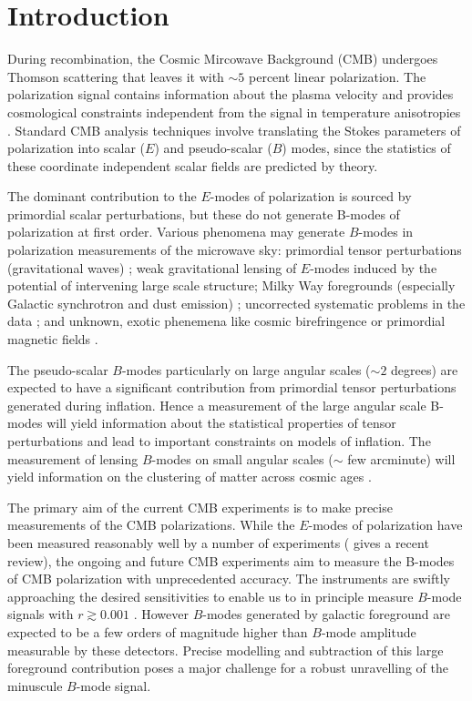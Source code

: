 \section{Introduction}
During recombination, the Cosmic Mircowave Background (CMB) undergoes Thomson scattering that leaves it with $\sim 5$ percent linear polarization.  The polarization signal contains information about the plasma velocity and provides cosmological constraints independent from the signal in temperature anisotropies \citep{1997NewA....2..323H}.  Standard CMB analysis techniques involve translating the Stokes parameters of polarization into scalar ($E$) and pseudo-scalar ($B$) modes, since the statistics of these coordinate independent scalar fields are predicted by theory.   

The dominant contribution to the $E$-modes of polarization is sourced by primordial scalar perturbations, but these do not generate B-modes of polarization at first order. Various phenomena may generate $B$-modes in polarization measurements of the microwave sky:
primordial tensor perturbations (gravitational waves)%
\citep{1997PhRvD..56..596H,1997PhRvL..78.2054S};
weak gravitational lensing of $E$-modes induced by the potential of intervening large scale structure;
Milky Way foregrounds (especially Galactic synchrotron and dust emission)
\citep{2016A&A...586A.133P};
uncorrected systematic problems in the data \citep{2003PhRvD..67d3004H,2008PhRvD..77h3003S};
and unknown, exotic phenemena like cosmic birefringence or primordial magnetic fields
\citep{1996ApJ...469....1K,1999PhRvL..83.1506L,2004ApJ...616....1C,2014MNRAS.438.2508P}.

The pseudo-scalar $B$-modes particularly on large angular scales ($\sim 2$ degrees) are expected to have a significant contribution from primordial tensor perturbations generated during inflation. Hence a measurement of the large angular scale B-modes will yield information about the statistical properties of tensor perturbations and lead to important constraints on models of inflation.  The measurement of lensing $B$-modes on small angular scales ($\sim$ few arcminute) will yield information on the clustering of matter across cosmic ages \citep{Abazajian2015, Kamionkowski2016,Abazajian2016,Hu2002c,Wehus2016}.
  
The primary aim of the current CMB experiments is to make precise measurements of the CMB polarizations. While the $E$-modes of polarization have been measured reasonably well by a number of experiments (\cite{2018RPPh...81d4901S} gives a recent review), the ongoing and future CMB experiments aim to measure the B-modes of CMB polarization with unprecedented accuracy. The instruments are swiftly approaching the desired sensitivities to enable us to in principle measure $B$-mode signals with $r\gtrsim 0.001$ \cite{Spider, CLASS,Litebird, BICEP22015, 2016arXiv161002743A, 2017arXiv170602464A,Remazeilles2018}. However $B$-modes generated by galactic foreground are expected to be a few orders of magnitude higher than $B$-mode amplitude measurable by these detectors.  Precise modelling and subtraction of this large foreground contribution poses a major challenge for a robust unravelling of the minuscule $B$-mode signal. 
 
